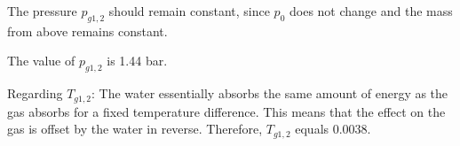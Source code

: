 The pressure \( p_{g1,2} \) should remain constant, since \( p_0 \) does not change and the mass from above remains constant.

The value of \( p_{g1,2} \) is 1.44 bar.

Regarding \( T_{g1,2} \): The water essentially absorbs the same amount of energy as the gas absorbs for a fixed temperature difference. This means that the effect on the gas is offset by the water in reverse. Therefore, \( T_{g1,2} \) equals 0.0038.